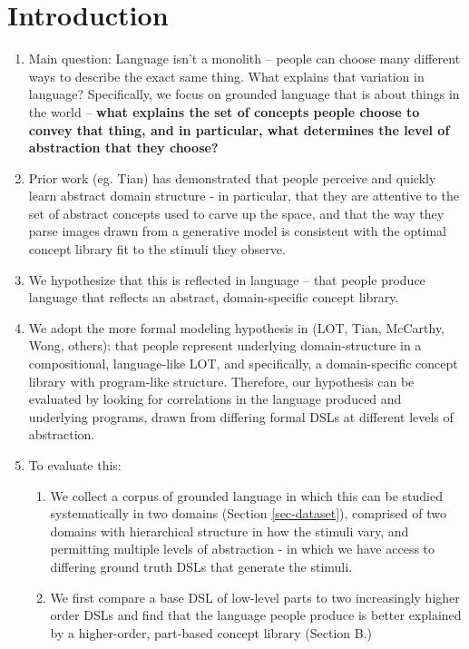 \documentclass[10pt,letterpaper]{article}
\begin{document}
\section{Introduction} \label{sec-introduction}
\begin{enumerate}
    \item Main question: Language isn’t a monolith -- people can choose many different ways to describe the exact  same thing. What explains that variation in language? Specifically, we focus on grounded language that is about things in the world -- \textbf{what explains the set of concepts people choose to convey that thing, and in particular, what determines the level of abstraction that they choose?}
    \item Prior work (eg. Tian) has demonstrated that people perceive and quickly learn abstract domain structure - in particular, that they are attentive to the set of abstract concepts used to carve up the space, and that the way they parse images drawn from a generative model is consistent with the optimal concept library fit to the stimuli they observe.
    \item We hypothesize that this is reflected in language -- that people produce language that reflects an abstract, domain-specific concept library. 
    \item We adopt the more formal modeling hypothesis in (LOT, Tian, McCarthy, Wong, others): that people represent underlying domain-structure in a compositional, language-like LOT, and specifically, a domain-specific concept library with program-like structure. Therefore, our hypothesis can be evaluated by looking for correlations in the language produced and underlying programs, drawn from differing formal DSLs at different levels of abstraction.
    \item To evaluate this:
        \begin{enumerate}
            \item We collect a corpus of grounded language in which this can be studied systematically in two domains (Section \ref{sec-dataset}), comprised of two domains with hierarchical structure in how the stimuli vary, and permitting multiple levels of abstraction - in which we have access to differing ground truth DSLs that generate the stimuli.
            \item We first compare a base DSL of low-level parts to two increasingly higher order DSLs and find that the language people produce is better explained by a higher-order, part-based concept library (Section B.)

        \end{enumerate}
\end{enumerate}
\end{document}
